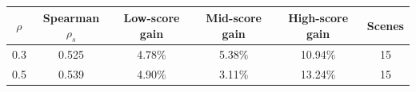 \begin{tabular}{@{}c c c c c c@{}}
\toprule
$\rho$ & Spearman $\rho_s$ & Low-score gain & Mid-score gain & High-score gain & Scenes\\
\midrule
0.3 & 0.525 & 4.78\% & 5.38\% & 10.94\% & 15\\
0.5 & 0.539 & 4.90\% & 3.11\% & 13.24\% & 15\\
\bottomrule
\end{tabular}
